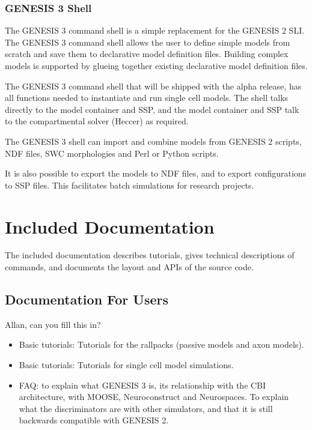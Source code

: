 \documentclass[12pt]{article}
\begin{document}
\subsubsection{GENESIS 3 Shell}

The GENESIS 3 command shell is a simple replacement for the GENESIS 2
SLI.  The GENESIS 3 command shell allows the user to define simple
models from scratch and save them to declarative model definition
files.  Building complex models is supported by glueing together
existing declarative model definition files.

The GENESIS 3 command shell that will be shipped with the alpha
release, has all functions needed to instantiate and run single cell
models.  The shell talks directly to the model container and SSP, and
the model container and SSP talk to the compartmental solver (Heccer)
as required.

The GENESIS 3 shell can import and combine models from GENESIS 2
scripts, NDF files, SWC morphologies and Perl or Python scripts.

It is also possible to export the models to NDF files, and to export
configurations to SSP files.  This facilitates batch simulations for
research projects.


\section{Included Documentation}

The included documentation describes tutorials, gives technical
descriptions of commands, and documents the layout and APIs of the
source code.


\subsection{Documentation For Users}

Allan, can you fill this in?

\begin{itemize}
\item Basic tutorials: Tutorials for the rallpacks (passive models and
  axon models).
\item Basic tutorials: Tutorials for single cell model simulations.
\item FAQ: to explain what GENESIS 3 is, its relationship with the CBI
  architecture, with MOOSE, Neuroconstruct and Neurospaces.  To
  explain what the discriminators are with other simulators, and that
  it is still backwards compatible with GENESIS 2.
\end{itemize}
\end{document}
